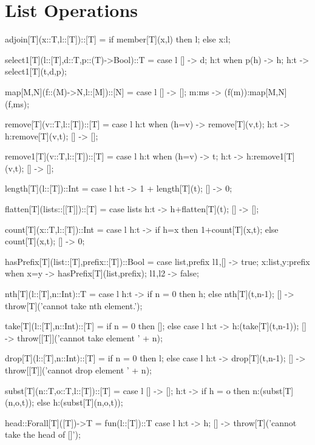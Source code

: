 \documentclass[5p,times]{elsarticle}
\begin{document}
\section{List Operations}

\label{sec:list_operations}


\begin{FigESL}
adjoin[T](x::T,l::[T])::[T] =
  if member[T](x,l)
  then l;
  else x:l;
  
select1[T](l::[T],d::T,p::(T)->Bool)::T =
  case l {
    [] -> d;
    h:t when p(h) -> h;
    h:t -> select1[T](t,d,p);
  }

map[M,N](f::(M)->N,l::[M])::[N] =
  case l {
    [] -> [];
    m:ms -> (f(m)):map[M,N](f,ms); 
  }
  
remove[T](v::T,l::[T])::[T] =
  case l {
    h:t when (h=v) -> remove[T](v,t);
    h:t        -> h:remove[T](v,t);
    []         -> [];
  }

remove1[T](v::T,l::[T])::[T] =
  case l {
    h:t when (h=v) -> t;
    h:t        -> h:remove1[T](v,t);
    []         -> [];
  }

length[T](l::[T])::Int = 
  case l {
    h:t -> 1 + length[T](t);
    [] -> 0;
  }

flatten[T](lists::[[T]])::[T] =
  case lists {
    h:t -> h+flatten[T](t);
    [] -> [];
  }
        
count[T](x::T,l::[T])::Int =
  case l {
    h:t -> if h=x then 1+count[T](x,t); else count[T](x,t);
    []  -> 0;
  }
  
hasPrefix[T](list::[T],prefix::[T])::Bool =
  case list,prefix {
    l1,[] -> true;
    x:list,y:prefix when x=y -> hasPrefix[T](list,prefix);
    l1,l2 -> false;
  }
  
nth[T](l::[T],n::Int)::T =
  case l {
    h:t    -> if n = 0 then h; else nth[T](t,n-1);
    []  -> throw[T]('cannot take nth element.');
  }
  
take[T](l::[T],n::Int)::[T] = 
  if n = 0
  then [];
  else 
    case l {
      h:t -> h:(take[T](t,n-1));
      [] -> throw[[T]]('cannot take element ' + n);
    }
  
drop[T](l::[T],n::Int)::[T] = 
  if n = 0
  then l;
  else 
    case l {
      h:t -> drop[T](t,n-1);
      [] -> throw[[T]]('cannot drop element ' + n);
    }
    
subst[T](n::T,o::T,l::[T])::[T] =
  case l {
    [] -> [];
    h:t -> 
      if h = o 
      then n:(subst[T](n,o,t)); 
      else h:(subst[T](n,o,t));
  }
  
head::Forall[T]([T])->T = fun(l::[T])::T
  case l {
    h:t -> h;
    [] -> throw[T]('cannot take the head of []');
  }
  

\end{FigESL}
\end{document}
